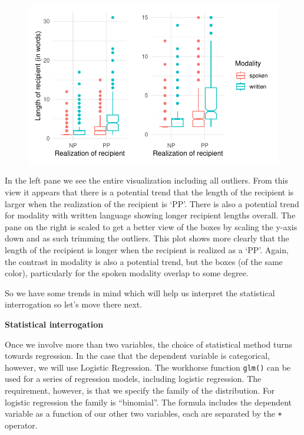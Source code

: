 \documentclass[
  letterpaper,
]{scrbook}
\begin{document}
\begin{figure}[h]

{\centering \includegraphics{./inference_files/figure-pdf/i-multi-cat-visual-1.pdf}

}

\end{figure}

In the left pane we see the entire visualization including all outliers.
From this view it appears that there is a potential trend that the
length of the recipient is larger when the realization of the recipient
is `PP'. There is also a potential trend for modality with written
language showing longer recipient lengths overall. The pane on the right
is scaled to get a better view of the boxes by scaling the y-axis down
and as such trimming the outliers. This plot shows more clearly that the
length of the recipient is longer when the recipient is realized as a
`PP'. Again, the contrast in modality is also a potential trend, but the
boxes (of the same color), particularly for the spoken modality overlap
to some degree.

So we have some trends in mind which will help us interpret the
statistical interrogation so let's move there next.

\textbf{Statistical interrogation}

Once we involve more than two variables, the choice of statistical
method turns towards regression. In the case that the dependent variable
is categorical, however, we will use Logistic Regression. The workhorse
function \texttt{glm()} can be used for a series of regression models,
including logistic regression. The requirement, however, is that we
specify the family of the distribution. For logistic regression the
family is ``binomial''. The formula includes the dependent variable as a
function of our other two variables, each are separated by the
\texttt{+} operator.
\end{document}
